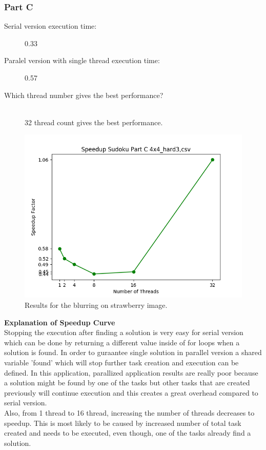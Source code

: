 \documentclass{article}
\newcommand\tab[1][0.5cm]{\hspace*{#1}}
\begin{document}
\newpage

\subsubsection{Part C}
\begin{description}
\item[Serial version execution time: ] 0.33
\item[Paralel version with single thread execution time: ] 0.57
\item[Which thread number gives the best performance?]\hfill \\
32 thread count gives the best performance.
\end{description} 

\begin{figure}[!htb]
        \centering
        \includegraphics[width=1\linewidth]{./img/speedup_part_2_C.png}
        \caption{Results for the blurring on strawberry image.}
\end{figure}
\textbf{Explanation of Speedup Curve}
\\
\tab Stopping the execution after finding a solution is very easy for 
serial version which can be done by returning a different value 
inside of for loops when a solution is found.
In order to guraantee single solution in parallel version a shared variable 'found'
which will stop further task creation and execution can be defined.
In this application, parallized application results are really poor 
because a solution might be found by one of the tasks but other tasks that are created previously
will continue execution and this creates a great overhead compared to serial version.
\\ \tab Also, from 1 thread to 16 thread, increasing the number of threads decreases to speedup. 
This is most likely to be caused by increased number of total task created and needs to be executed, even though, 
one of the tasks already find a solution.
\newpage
\end{document}

